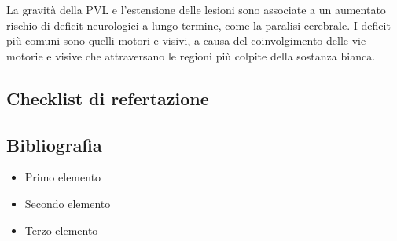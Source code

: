 La gravità della PVL e l'estensione delle lesioni sono associate a un aumentato rischio di deficit neurologici a lungo termine, come la paralisi cerebrale. I deficit più comuni sono quelli motori e visivi, a causa del coinvolgimento delle vie motorie e visive che attraversano le regioni più colpite della sostanza bianca.

\subsection{Checklist di refertazione}

\subsection{Bibliografia}
\small{
	
	
}


\begin{itemize}[label=$\square$] %
	\item Primo elemento
	\item Secondo elemento
	\item Terzo elemento
\end{itemize}